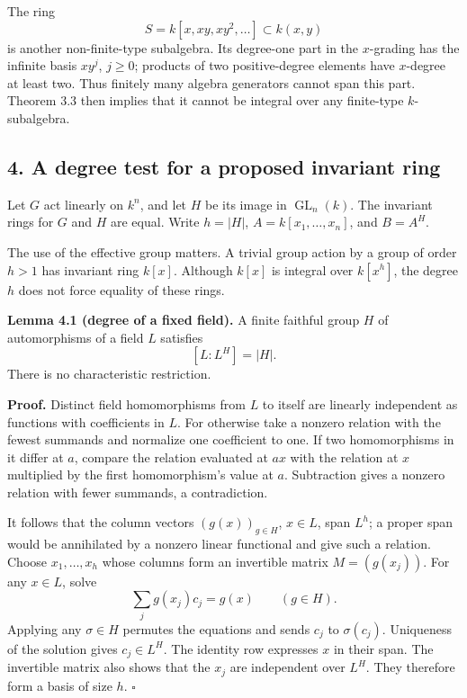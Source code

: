 \documentclass[
]{article}
\begin{document}
The ring \[
S=k [x,xy,xy^2,\ldots]\subset k(x,y)
\] is another non-finite-type subalgebra. Its degree-one part in the
\(x\)-grading has the infinite basis \(xy^j\), \(j\geq0\); products of
two positive-degree elements have \(x\)-degree at least two. Thus
finitely many algebra generators cannot span this part. Theorem 3.3 then
implies that it cannot be integral over any finite-type
\(k\)-subalgebra.

\subsection{4. A degree test for a proposed invariant
ring}\label{a-degree-test-for-a-proposed-invariant-ring}

Let \(G\) act linearly on \(k^n\), and let \(H\) be its image in
\(\operatorname{GL}_n(k)\). The invariant rings for \(G\) and \(H\) are
equal. Write \(h=|H|\), \(A=k [x_1,\ldots,x_n]\), and \(B=A^H\).

The use of the effective group matters. A trivial group action by a
group of order \(h>1\) has invariant ring \(k [x]\). Although \(k [x]\)
is integral over \(k [x^h]\), the degree \(h\) does not force equality
of these rings.

\protect{}\label{lemma-4-1}{}

\textbf{Lemma 4.1 (degree of a fixed field).} A finite faithful group
\(H\) of automorphisms of a field \(L\) satisfies \[
[L:L^H]=|H|.
\] There is no characteristic restriction.

\textbf{Proof.} Distinct field homomorphisms from \(L\) to itself are
linearly independent as functions with coefficients in \(L\). For
otherwise take a nonzero relation with the fewest summands and normalize
one coefficient to one. If two homomorphisms in it differ at \(a\),
compare the relation evaluated at \(ax\) with the relation at \(x\)
multiplied by the first homomorphism's value at \(a\). Subtraction gives
a nonzero relation with fewer summands, a contradiction.

It follows that the column vectors \((g(x))_{g\in H}\), \(x\in L\), span
\(L^h\); a proper span would be annihilated by a nonzero linear
functional and give such a relation. Choose \(x_1,\ldots,x_h\) whose
columns form an invertible matrix \(M=(g(x_j))\). For any \(x\in L\),
solve \[
\sum_j g(x_j)c_j=g(x)\qquad(g\in H).
\] Applying any \(\sigma\in H\) permutes the equations and sends \(c_j\)
to \(\sigma(c_j)\). Uniqueness of the solution gives \(c_j\in L^H\). The
identity row expresses \(x\) in their span. The invertible matrix also
shows that the \(x_j\) are independent over \(L^H\). They therefore form
a basis of size \(h\). \(\square\)
\end{document}

